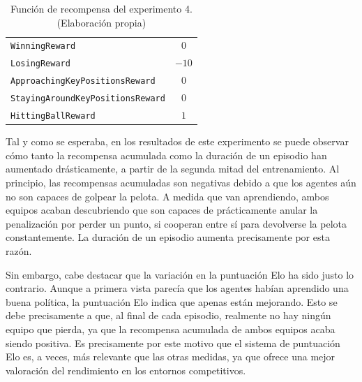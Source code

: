 \begin{table}[H]
\centering
    \begin{tabular}{|>{\rowmac}p{6.5cm}|>{\rowmac}c<{\clearrow}|} 
        \hline
        \multicolumn{1}{|c|}{\textbf{Recompensa}} & \multicolumn{1}{c|}{\textbf{Valor}} \\ \hline \hline
        \texttt{WinningReward} & $0$ \\
        \hline
        \texttt{LosingReward} & $-10$ \\
        \hline
        \texttt{ApproachingKeyPositionsReward} & $0$ \\
        \hline
        \texttt{StayingAroundKeyPositionsReward} & $0$ \\
        \hline
        \texttt{HittingBallReward} & $1$ \\
        \hline
    \end{tabular}
    \caption[Función de recompensa del experimento 4]{Función de recompensa del experimento 4. (Elaboración propia)}
    \label{tab:exp4-rewards}
\end{table}

Tal y como se esperaba, en los resultados de este experimento se puede observar cómo tanto la recompensa acumulada como la duración de un episodio han aumentado drásticamente, a partir de la segunda mitad del entrenamiento. Al principio, las recompensas acumuladas son negativas debido a que los agentes aún no son capaces de golpear la pelota. A medida que van aprendiendo, ambos equipos acaban descubriendo que son capaces de prácticamente anular la penalización por perder un punto, si cooperan entre sí para devolverse la pelota constantemente. La duración de un episodio aumenta precisamente por esta razón.

Sin embargo, cabe destacar que la variación en la puntuación Elo ha sido justo lo contrario. Aunque a primera vista parecía que los agentes habían aprendido una buena política, la puntuación Elo indica que apenas están mejorando. Esto se debe precisamente a que, al final de cada episodio, realmente no hay ningún equipo que pierda, ya que la recompensa acumulada de ambos equipos acaba siendo positiva. Es precisamente por este motivo que el sistema de puntuación Elo es, a veces, más relevante que las otras medidas, ya que ofrece una mejor valoración del rendimiento en los entornos competitivos.

